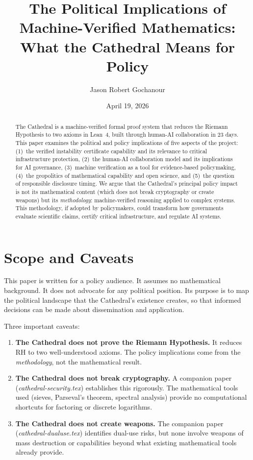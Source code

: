 \documentclass[11pt,a4paper]{article}
\title{%
  The Political Implications of Machine-Verified Mathematics:\\
  What the Cathedral Means for Policy%
}
\author{
  Jason Robert Gochanour
}
\date{April 19, 2026}
\begin{document}
\maketitle

\begin{abstract}
The Cathedral is a machine-verified formal proof system that reduces
the Riemann Hypothesis to two axioms in Lean~4, built through
human-AI collaboration in 23 days. This paper examines the political
and policy implications of five aspects of the project: (1)~the
verified instability certificate capability and its relevance to
critical infrastructure protection, (2)~the human-AI collaboration
model and its implications for AI governance, (3)~machine
verification as a tool for evidence-based policymaking,
(4)~the geopolitics of mathematical capability and open science, and
(5)~the question of responsible disclosure timing. We argue that
the Cathedral's principal policy impact is not its mathematical
content (which does not break cryptography or create weapons) but
its \emph{methodology}: machine-verified reasoning applied to
complex systems. This methodology, if adopted by policymakers,
could transform how governments evaluate scientific claims,
certify critical infrastructure, and regulate AI systems.
\end{abstract}

\tableofcontents

\section{Scope and Caveats}

This paper is written for a policy audience. It assumes no
mathematical background. It does not advocate for any political
position. Its purpose is to map the political landscape that
the Cathedral's existence creates, so that informed decisions can
be made about dissemination and application.

Three important caveats:

\begin{enumerate}
  \item \textbf{The Cathedral does not prove the Riemann Hypothesis.}
    It reduces RH to two well-understood axioms. The policy
    implications come from the \emph{methodology}, not the
    mathematical result.

  \item \textbf{The Cathedral does not break cryptography.} A
    companion paper (\emph{cathedral-security.tex}) establishes this
    rigorously. The mathematical tools used (sieves, Parseval's
    theorem, spectral analysis) provide no computational shortcuts
    for factoring or discrete logarithms.

  \item \textbf{The Cathedral does not create weapons.} The
    companion paper (\emph{cathedral-dualuse.tex}) identifies
    dual-use risks, but none involve weapons of mass destruction
    or capabilities beyond what existing mathematical tools already
    provide.
\end{enumerate}
\end{document}
